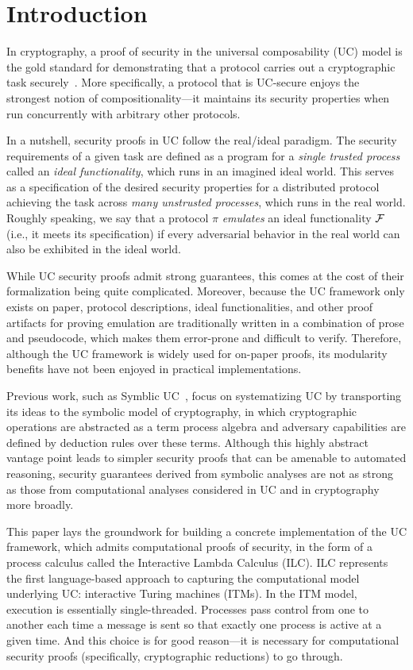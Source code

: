 \section{Introduction}
\label{sec:introduction}

In cryptography, a proof of security in the universal composability (UC) model
is the gold standard for demonstrating that a protocol carries out a
cryptographic task securely~\cite{canetti2001universally}. More specifically, a
protocol that is UC-secure enjoys the strongest notion of compositionality---it
maintains its security properties when run concurrently with arbitrary other
protocols.

In a nutshell, security proofs in UC follow the real/ideal paradigm. The
security requirements of a given task are defined as a program for a
\emph{single trusted process} called an \emph{ideal functionality}, which runs
in an imagined ideal world. This serves as a specification of the desired
security properties for a distributed protocol achieving the task across
\emph{many unstrusted processes}, which runs in the real world. Roughly
speaking, we say that a protocol $\pi$ \emph{emulates} an ideal functionality
$\mathcal{{F}}$ (i.e., it meets its specification) if every adversarial behavior in the
real world can also be exhibited in the ideal world.

While UC security proofs admit strong guarantees, this comes at the cost of
their formalization being quite complicated. Moreover, because the UC framework
only exists on paper, protocol descriptions, ideal functionalities, and other
proof artifacts for proving emulation are traditionally written in a combination
of prose and pseudocode, which makes them error-prone and difficult to
verify. Therefore, although the UC framework is widely used for on-paper proofs,
its modularity benefits have not been enjoyed in practical implementations.

Previous work, such as Symblic UC~\cite{bohl2016symbolic}, focus on
systematizing UC by transporting its ideas to the symbolic model of
cryptography, in which cryptographic operations are abstracted as a term process
algebra and adversary capabilities are defined by deduction rules over these
terms. Although this highly abstract vantage point leads to simpler security
proofs that can be amenable to automated reasoning, security guarantees derived
from symbolic analyses are not as strong as those from computational analyses
considered in UC and in cryptography more broadly.

This paper lays the groundwork for building a concrete implementation of the UC
framework, which admits computational proofs of security, in the form of a
process calculus called the Interactive Lambda Calculus (ILC). ILC represents
the first language-based approach to capturing the computational model
underlying UC: interactive Turing machines (ITMs). In the ITM model, execution
is essentially single-threaded. Processes pass control from one to another each
time a message is sent so that exactly one process is active at a given
time. And this choice is for good reason---it is necessary for computational
security proofs (specifically, cryptographic reductions) to go through.

